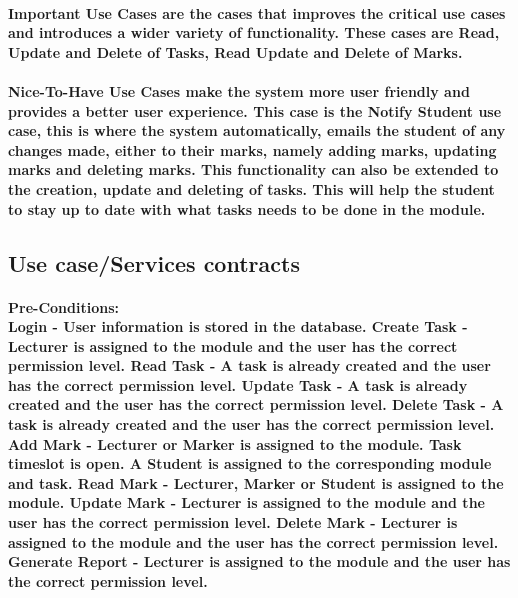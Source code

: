 \documentclass[12pt]{article}
\begin{document}
 \paragraph*{Important Use Cases are the cases that improves the critical use cases and introduces a wider variety of functionality. These cases are Read, Update and Delete of Tasks, Read Update  and Delete of Marks.}
 \paragraph*{Nice-To-Have Use Cases make the system more user friendly and provides a better user experience. This case is the Notify Student use case, this is where the system automatically, emails the student of any changes made, either to their marks, namely adding marks, updating marks and deleting marks. This functionality can also be extended to the creation, update and deleting of tasks. This will help the student to stay up to date with what tasks needs to be done in the module.}
 \subsection{Use case/Services contracts}
 \paragraph*{Pre-Conditions: \\ Login - User information is stored in the database.
 Create Task - Lecturer is assigned to the module and the user has the correct permission level.
 Read Task - A task is already created and the user has the correct permission level.
 Update Task - A task is already created and the user has the correct permission level.
 Delete Task - A task is already created and the user has the correct permission level.
 Add Mark - Lecturer or Marker is assigned to the module. Task timeslot is open. A Student is assigned to the corresponding module and task.
 Read Mark - Lecturer, Marker or Student is assigned to the module.
 Update Mark - Lecturer is assigned to the module and the user has the correct permission level.
 Delete Mark - Lecturer is assigned to the module and the user has the correct permission level.
 Generate Report - Lecturer is assigned to the module and the user has the correct permission level.}
\end{document}

